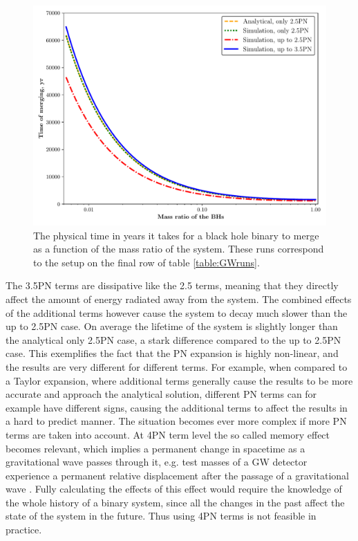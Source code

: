 \documentclass[english, oneside]{HYgradu}
\begin{document}
\begin{figure}[h!tb]
\centering
\includegraphics[scale=0.6]{../images/bh-merge-ratio.pdf}
\caption{The physical time in years it takes for a black hole binary to merge as a function of the mass ratio of the system. These runs correspond to the setup on the final row of table \ref{table:GWruns}.}
\label{fig:bh-merge-ratio}
\end{figure}


The 3.5PN terms are dissipative like the 2.5 terms, meaning that they directly affect the amount of energy radiated away from the system. The combined effects of the additional terms however cause the system to decay much slower than the up to 2.5PN case. On average the lifetime of the system is slightly longer than the analytical only 2.5PN case, a stark difference compared to the up to 2.5PN case. This exemplifies the fact that the PN expansion is highly non-linear, and the results are very different for different terms. For example, when compared to a Taylor expansion, where additional terms generally cause the results to be more accurate and approach the analytical solution, different PN terms can for example have different signs, causing the additional terms to affect the results in a hard to predict manner. The situation becomes ever more complex if more PN terms are taken into account. At 4PN term level the so called memory effect becomes relevant, which implies a permanent change in spacetime as a gravitational wave passes through it, e.g. test masses of a GW detector experience a permanent relative displacement after the passage of a gravitational wave \citep{blanchet:2014}. Fully calculating the effects of this effect would require the knowledge of the whole history of a binary system, since all the changes in the past affect the state of the system in the future. Thus using 4PN terms is not feasible in practice.
\end{document}
